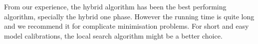 \documentclass[a4paper, 11pt]{article}
\begin{document}
From our experience, the hybrid algorithm has been the best performing algorithm, specially the hybrid one phase.
However the running time is quite long and we recommend it for complicate minimisation problems. 
For short and easy model calibrations, the local search algorithm might be a better choice.
\end{document}
